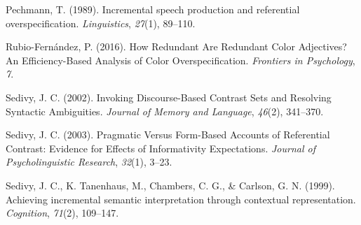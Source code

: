 \documentclass[10pt, letterpaper]{article}
\begin{document}
\hypertarget{ref-pechmann_incremental_1989}{}
Pechmann, T. (1989). Incremental speech production and referential
overspecification. \emph{Linguistics}, \emph{27}(1), 89--110.

\hypertarget{ref-rubio-fernandez_how_2016}{}
Rubio-Fernández, P. (2016). How Redundant Are Redundant Color
Adjectives? An Efficiency-Based Analysis of Color Overspecification.
\emph{Frontiers in Psychology}, \emph{7}.

\hypertarget{ref-sedivy_invoking_2002}{}
Sedivy, J. C. (2002). Invoking Discourse-Based Contrast Sets and
Resolving Syntactic Ambiguities. \emph{Journal of Memory and Language},
\emph{46}(2), 341--370.

\hypertarget{ref-sedivy_pragmatic_2003-2}{}
Sedivy, J. C. (2003). Pragmatic Versus Form-Based Accounts of
Referential Contrast: Evidence for Effects of Informativity
Expectations. \emph{Journal of Psycholinguistic Research}, \emph{32}(1),
3--23.

\hypertarget{ref-sedivy_achieving_1999}{}
Sedivy, J. C., K. Tanenhaus, M., Chambers, C. G., \& Carlson, G. N.
(1999). Achieving incremental semantic interpretation through contextual
representation. \emph{Cognition}, \emph{71}(2), 109--147.


\end{document}
